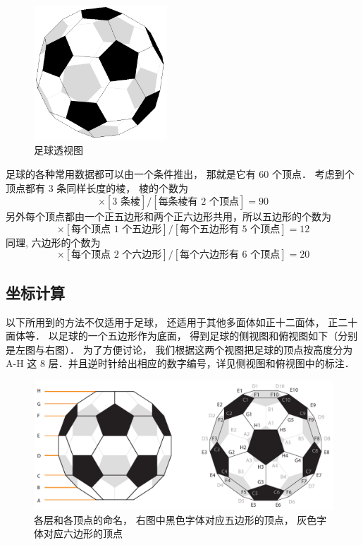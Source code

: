 

\begin{figure}[ht]
\centering
\includegraphics[width=5cm]{./figures/FootBl1.png}
\caption{足球透视图} \label{FootBl_fig1}
\end{figure}

足球的各种常用数据都可以由一个条件推出， 那就是它有 60 个顶点． 考虑到个顶点都有 3 条同样长度的棱， 棱的个数为
\begin{equation}
[\text{60 顶点}] \times [\text{3 条棱}] / [\text{每条棱有 2 个顶点}] = 90
\end{equation}
另外每个顶点都由一个正五边形和两个正六边形共用，所以五边形的个数为
\begin{equation}
[\text{60 顶点}] \times [\text{每个顶点 1 个五边形}] / [\text{每个五边形有 5 个顶点}] = 12
\end{equation}
同理, 六边形的个数为
\begin{equation}
[\text{60 顶点}] \times [\text{每个顶点 2 个六边形}] / [\text{每个六边形有 6 个顶点}] = 20
\end{equation}

\subsection{坐标计算}
以下所用到的方法不仅适用于足球， 还适用于其他多面体如正十二面体， 正二十面体等． 以足球的一个五边形作为底面， 得到足球的侧视图和俯视图如下（分别是左图与右图）． 为了方便讨论， 我们根据这两个视图把足球的顶点按高度分为 A-H 这 8 层．并且逆时针给出相应的数字编号，详见侧视图和俯视图中的标注．

\begin{figure}[ht]
\centering
\includegraphics[width=14cm]{./figures/FootBl2.pdf}
\caption{各层和各顶点的命名， 右图中黑色字体对应五边形的顶点， 灰色字体对应六边形的顶点} \label{FootBl_fig2}
\end{figure}

